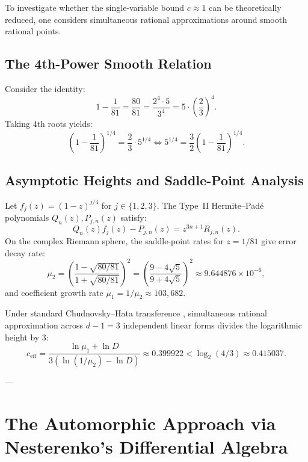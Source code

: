 \documentclass[11pt,reqno]{article}
\theoremstyle{plain}
\theoremstyle{definition}
\numberwithin{equation}{section}
\begin{document}
To investigate whether the single-variable bound $c \approx 1$ can be theoretically reduced, one considers simultaneous rational approximations around smooth rational points.

\subsection{The 4th-Power Smooth Relation}
Consider the identity:
\begin{equation}\label{eq:base_identity}
1 - \frac{1}{81} = \frac{80}{81} = \frac{2^4 \cdot 5}{3^4} = 5 \cdot \left(\frac{2}{3}\right)^4.
\end{equation}
Taking 4th roots yields:
\begin{equation}
\left(1 - \frac{1}{81}\right)^{1/4} = \frac{2}{3} \cdot 5^{1/4} \iff 5^{1/4} = \frac{3}{2} \left(1 - \frac{1}{81}\right)^{1/4}.
\end{equation}

\subsection{Asymptotic Heights and Saddle-Point Analysis}
Let $f_j(z) = (1 - z)^{j/4}$ for $j \in \{1, 2, 3\}$. The Type~II Hermite--Pad\'e polynomials $Q_n(z), P_{j,n}(z)$ satisfy:
\begin{equation}
Q_n(z) f_j(z) - P_{j,n}(z) = z^{3n+1} R_{j,n}(z).
\end{equation}
On the complex Riemann sphere, the saddle-point rates for $z = 1/81$ give error decay rate:
\begin{equation}
\mu_2 = \left(\frac{1 - \sqrt{80/81}}{1 + \sqrt{80/81}}\right)^2 = \left(\frac{9 - 4\sqrt{5}}{9 + 4\sqrt{5}}\right)^2 \approx 9.644876 \times 10^{-6},
\end{equation}
and coefficient growth rate $\mu_1 = 1/\mu_2 \approx 103{,}682$.

Under standard Chudnovsky--Hata transference \cite{chudnovsky1981, hata1993}, simultaneous rational approximation across $d-1 = 3$ independent linear forms divides the logarithmic height by 3:
\begin{equation}
c_{\mathrm{eff}} = \frac{\ln \mu_1 + \ln D}{3\left(\ln(1/\mu_2) - \ln D\right)} \approx 0.399922 < \log_2(4/3) \approx 0.415037.
\end{equation}

---

\section{The Automorphic Approach via Nesterenko's Differential Algebra}
\end{document}
